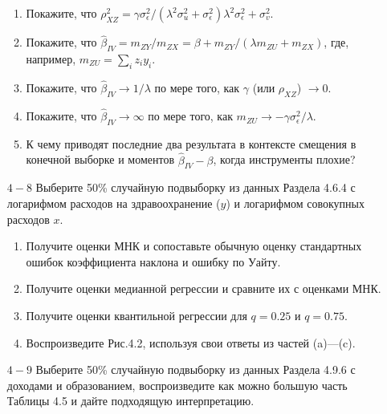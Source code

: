 \begin{small}
\begin{enumerate}
\begin{enumerate}
\item Покажите, что $\rho_{XZ}^2 = \gamma \sigma^2_{\epsilon} /(\lambda^2 \sigma^2_{u} +\sigma^2_{\epsilon})\lambda^2 \sigma^2_{\epsilon} +\sigma^2_{v}$.
\item Покажите, что $\hat{\beta}_{IV} = m_{ZY}/m_{ZX} = \beta + m_{ZY}/(\lambda m_{ZU}+m_{ZX})$, где, например, $m_{ZU} = \sum_i z_i y_i$.
\item Покажите, что $\hat{\beta}_{IV}\rightarrow 1/\lambda$ по мере того, как $\gamma$ (или $\rho_{XZ}$) $\rightarrow 0$.
\item  Покажите, что $\hat{\beta}_{IV}\rightarrow \infty$ по мере того, как $m_{ZU} \rightarrow -\gamma \sigma^2_{\epsilon}/\lambda$.
\item К чему приводят последние два результата в контексте смещения в конечной выборке и моментов $\hat{\beta}_{IV}-\beta$, когда инструменты плохие?
\end{enumerate}
\item [$4-8$] Выберите 50\% случайную подвыборку из данных Раздела 4.6.4 с логарифмом расходов на здравоохранение ($y$) и логарифмом совокупных расходов $x$.
\begin{enumerate} 
\item Получите оценки МНК и сопоставьте обычную оценку стандартных ошибок коэффициента наклона и ошибку по Уайту.
\item Получите оценки медианной регрессии и сравните их с оценками МНК. 
\item Получите оценки квантильной регрессии для $q=0.25$ и $q=0.75$.
\item Воспроизведите Рис.4.2, используя свои ответы из частей (a)---(c).
\end{enumerate}
\item [$4-9$] Выберите 50\% случайную подвыборку из данных Раздела 4.9.6 с доходами и образованием, воспроизведите как можно большую часть Таблицы 4.5  и дайте подходящую интерпретацию.
\end{enumerate}

\end{small}

